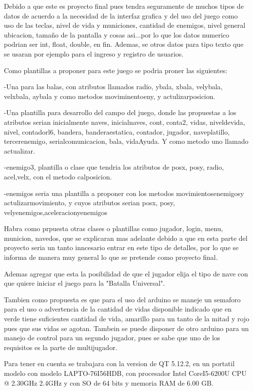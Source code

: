 \documentclass{article}
\begin{document}
Debido a que este es proyecto final pues tendra seguramente de muchos tipos de datos de acuerdo a la necesidad de la interfaz grafica y del uso del juego como uso de las teclas, nivel de vida y municiones, cantidad de enemigos, nivel general ubicacion, tamaño de la pantalla y cosas asi...por lo que los datos numerico podrian ser int, float, double, en fin. Ademas, se otros datos para tipo texto que se usaran por ejemplo para el ingreso y registro de usuarios.

Como plantillas a proponer para este juego se podria proner las siguientes:

-Una para las balas, con atributos llamados radio, ybala, xbala, velybala, velxbala, aybala y como metodos moviminentoeny, y actulizarposicion.

-Una plantilla para desarrollo del campo del juego, donde las propuestas a los atributos serian inicialmente naves, inicialnaves, cont, conta2, vidas, niveldevida, nivel, contadorl6, bandera, banderaestatica, contador, jugador, naveplatillo, tercerenemigo, serialcomunicacion, bala, vidaAyuda. Y como metodo uno llamado actualizar.

-enemigo3, plantilla o clase que tendria los atributos de posx, posy, radio, acel,velx, con el metodo calposicion.

-enemigos seria una plantilla a proponer con los metodos  movimientosenemigosy actulizarmovimiento, y cuyos atributos serian posx, posy, velyenemigos,aceleracionyenemigos

Habra como prpuesta otras clases o plantillas como jugador, login, menu, municion, navedos, que se explicaran mas adelante debido a que en esta parte del proyecto seria un tanto inncesario entrar en este tipo de detalles, por lo que se informa de manera muy general lo que se pretende como proyecto final.


Ademas agregar que esta la posibilidad de que el jugador elija el tipo de nave con que quiere iniciar el juego para la "Batalla Universal".

Tambien como propuesta es que para el uso del arduino se maneje un semaforo para el uso o advertencia  de la cantidad de vidas disponible indicado que  en verde tiene suficientes cantidad de vida, amarillo para un tanto de la mitad y rojo pues que sus vidas se agotan. Tambein se puede disponer de otro arduino para un manejo de control para un segundo jugador, pues se sabe que uno de los requisitos es la parte de multijugador.


Para tener en cuenta se trabajara con la version de QT 5.12.2, en un portatil modelo con modelo LAPTO-76I56HDB, con procesador Intel CoreI5-6200U CPU @ 2.30GHz 2.4GHz y con SO de 64 bits y memoria RAM de 6.00 GB.
\end{document}

